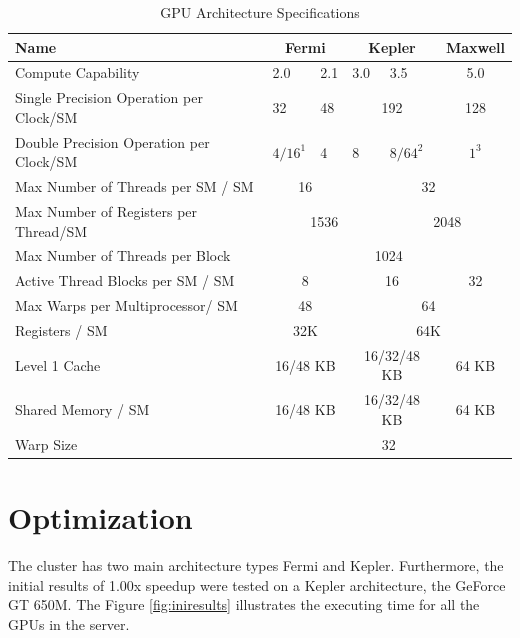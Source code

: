 \begin{table}[h]
\centering
  \begin{tabular} { | l | l  | l | l | l  |  l  | l |}
    \hline
    Name & \multicolumn{2}{|c|}{Fermi} & \multicolumn{2}{|c|}{Kepler} &  \multicolumn{2}{|c|}{Maxwell} \\
    \hline
    Compute Capability & 2.0 & 2.1 & 3.0 & 3.5 & \multicolumn{2}{|c|}{5.0}\\
   \hline
    Single Precision Operation per Clock/SM & 32 & 48 & \multicolumn{2}{|c|}{192} & \multicolumn{2}{|c|}{128}\\
   \hline
    Double Precision Operation per Clock/SM & $4/16^1$ & 4 & 8 & $8/64^2$ & \multicolumn{2}{|c|}{$1^3$}\\
   \hline
    Max Number of Threads per SM / SM & \multicolumn{2}{|c|}{16} & \multicolumn{4}{|c|}{32}\\
   \hline
    Max Number of Registers per Thread/SM & \multicolumn{3}{|c|}{1536} & \multicolumn{3}{|c|}{2048}\\
   \hline
       Max Number of Threads per Block & \multicolumn{6}{|c|}{1024}\\
   \hline
   Active Thread Blocks per SM / SM & \multicolumn{2}{|c|}{8} & \multicolumn{2}{|c|}{16} & \multicolumn{2}{|c|}{32}\\
   \hline
   Max Warps per Multiprocessor/ SM & \multicolumn{2}{|c|}{48} & \multicolumn{4}{|c|}{64}\\
   \hline
   Registers / SM & \multicolumn{2}{|c|}{32K} & \multicolumn{4}{|c|}{64K}\\
   \hline
   Level 1 Cache & \multicolumn{2}{|c|}{16/48 KB} & \multicolumn{2}{|c|}{16/32/48 KB} & \multicolumn{2}{|c|}{64 KB}\\
   \hline
   Shared Memory / SM & \multicolumn{2}{|c|}{16/48 KB} & \multicolumn{2}{|c|}{16/32/48 KB} & \multicolumn{2}{|c|}{64 KB}\\
   \hline
   Warp Size & \multicolumn{6}{c|}{32}  \\
   \hline
  \end{tabular}
  \caption{GPU Architecture Specifications}
  \label{tab:arch}
  \end{table}
 
\section{Optimization}

The cluster has two  main architecture types Fermi and Kepler. Furthermore, the initial results of 1.00x speedup were tested on a Kepler architecture, the GeForce GT 650M. The Figure \ref{fig:iniresults} illustrates the executing time for all the GPUs in the server.

